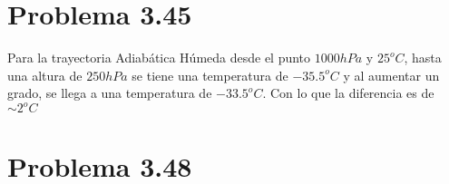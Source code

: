 \vspace{0.5cm}


\section*{Problema 3.45}
Para la trayectoria Adiabática Húmeda desde el punto $1000hPa$ y $25^o C$, hasta una altura de $250hPa$ se tiene una temperatura de $-35.5^o C$ y al aumentar un grado, se llega a una temperatura de $-33.5^o C$. Con lo que la diferencia es de $\boxed{\sim 2^o C}$
	
\section*{Problema 3.48}























